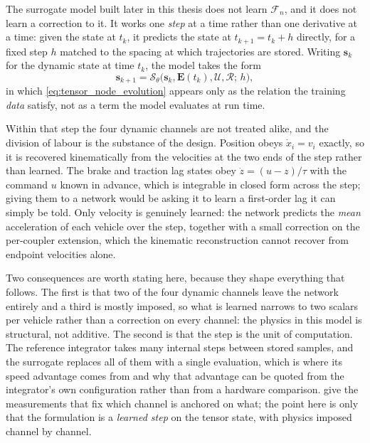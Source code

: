 The surrogate model built later in this thesis does not learn $\mathcal{F}_n$, and it does not learn a correction to it.
It works one \emph{step} at a time rather than one derivative at a time: given the state at $t_k$, it predicts the state at $t_{k+1}=t_k+h$ directly, for a fixed step $h$ matched to the spacing at which trajectories are stored.
Writing $\mathbf{s}_k$ for the dynamic state at time $t_k$, the model takes the form
\begin{equation}
    \mathbf{s}_{k+1}
    = \mathcal{S}_\theta\bigl(\mathbf{s}_k, \mathbf{E}(t_k), \mathcal{U}, \mathcal{R};\, h\bigr),
    \label{eq:tensor_step_operator}
\end{equation}
in which \cref{eq:tensor_node_evolution} appears only as the relation the training \emph{data} satisfy, not as a term the model evaluates at run time.

Within that step the four dynamic channels are not treated alike, and the division of labour is the substance of the design.
Position obeys $\dot{x}_i = v_i$ exactly, so it is recovered kinematically from the velocities at the two ends of the step rather than learned.
The brake and traction lag states obey $\dot{z} = (u - z)/\tau$ with the command $u$ known in advance, which is integrable in closed form across the step; giving them to a network would be asking it to learn a first-order lag it can simply be told.
Only velocity is genuinely learned: the network predicts the \emph{mean} acceleration of each vehicle over the step, together with a small correction on the per-coupler extension, which the kinematic reconstruction cannot recover from endpoint velocities alone.

Two consequences are worth stating here, because they shape everything that follows.
The first is that two of the four dynamic channels leave the network entirely and a third is mostly imposed, so what is learned narrows to two scalars per vehicle rather than a correction on every channel: the physics in this model is structural, not additive.
The second is that the step is the unit of computation.
The reference integrator takes many internal steps between stored samples, and the surrogate replaces all of them with a single evaluation, which is where its speed advantage comes from and why that advantage can be quoted from the integrator's own configuration rather than from a hardware comparison.
 give the measurements that fix which channel is anchored on what; the point here is only that the formulation is a \emph{learned step} on the tensor state, with physics imposed channel by channel.


